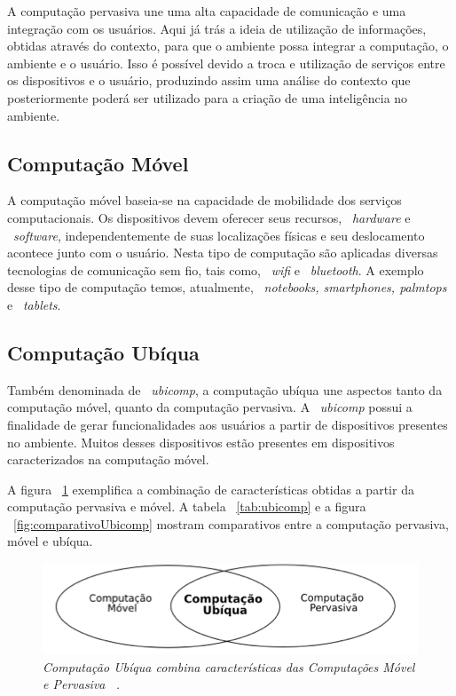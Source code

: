 		A computação pervasiva une uma alta capacidade de comunicação e uma integração com os usuários.
		Aqui já trás a ideia de utilização de informações, obtidas através do contexto, para que o ambiente
		possa integrar a computação, o ambiente e o usuário. Isso é possível devido a troca e utilização de
		serviços entre os dispositivos e o usuário, produzindo assim uma análise do contexto que
		posteriormente poderá ser utilizado para a criação de uma inteligência no ambiente.
	
	\subsection{Computação Móvel}
	
		A computação móvel baseia-se na capacidade de mobilidade dos serviços computacionais. Os
		dispositivos devem oferecer seus recursos, ~\textit{hardware} e ~\textit{software},
		independentemente de suas localizações físicas e seu deslocamento acontece junto com o usuário.
		Nesta tipo de computação são aplicadas diversas tecnologias de comunicação sem fio, tais como,
		~\textit{wifi} e ~\textit{bluetooth}. A exemplo desse tipo de computação temos, atualmente,
		~\textit{notebooks, smartphones, palmtops} e ~\textit{tablets}.

	\subsection{Computação Ubíqua}
	
		Também denominada de ~\textit{ubicomp}, a computação ubíqua une aspectos tanto da
		computação móvel, quanto da computação pervasiva. A ~\textit{ubicomp} possui a finalidade de
		gerar funcionalidades aos usuários a partir de dispositivos presentes no ambiente. Muitos desses
		dispositivos estão presentes em dispositivos caracterizados na computação móvel.
		
		A figura ~\ref{fig:comparativoUbicomp2} exemplifica a combinação de características obtidas a
		partir da computação pervasiva e móvel. A tabela ~\ref{tab:ubicomp} e a figura
		~\ref{fig:comparativoUbicomp} mostram comparativos entre a computação pervasiva, móvel e ubíqua.
		
		\begin{figure}[h]
			\centering \includegraphics[scale=.75]{figuras/cap2/comparativoUbicomp2.png}
			\caption {\textit{Computação Ubíqua combina características das Computações Móvel e
			Pervasiva ~\cite{alegomes}.}}
			\label{fig:comparativoUbicomp2} 
		\end{figure}
		
